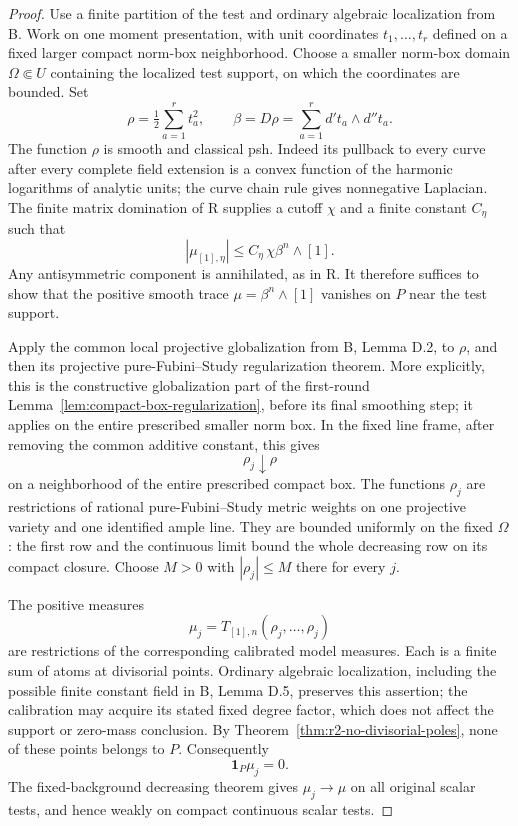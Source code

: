 \documentclass[11pt,a4paper]{article}
\numberwithin{equation}{section}
\theoremstyle{definition}
\theoremstyle{remark}
\begin{document}
\begin{proof}
Use a finite partition of the test and ordinary algebraic
localization from B. Work on one moment presentation, with unit
coordinates $t_1,\ldots,t_r$ defined on a fixed larger compact
norm-box neighborhood. Choose a smaller norm-box domain
$\Omega\Subset U$ containing the localized test support, on
which the coordinates are bounded. Set
\[
 \rho=\tfrac12\sum_{a=1}^r t_a^2,
 \qquad \beta=D\rho=\sum_{a=1}^r d't_a\wedge d''t_a.
\]
The function $\rho$ is smooth and classical psh. Indeed its
pullback to every curve after every complete field extension is
a convex function of the harmonic logarithms of analytic units;
the curve chain rule gives nonnegative Laplacian.
The finite matrix domination of R supplies a cutoff $\chi$ and
a finite constant $C_\eta$ such that
\begin{equation}
\label{eq:r2-ambient-trace-domination}
 |\mu_{[1],\eta}|\leq C_\eta\,\chi\beta^n\wedge[1].
\end{equation}
Any antisymmetric component is annihilated, as in R. It therefore
suffices to show that the positive smooth trace
$\mu=\beta^n\wedge[1]$ vanishes on $P$ near the test support.

Apply the common local projective globalization from B, Lemma
D.2, to $\rho$, and then its projective pure-Fubini--Study
regularization theorem. More explicitly, this is the constructive
globalization part of the first-round
Lemma~\ref{lem:compact-box-regularization}, before its final
smoothing step; it applies on the entire prescribed smaller
norm box. In the fixed line frame, after removing
the common additive constant, this gives
\[
 \rho_j\downarrow\rho
\]
on a neighborhood of the entire prescribed compact box. The
functions $\rho_j$ are restrictions of rational pure-Fubini--Study
metric weights on one projective variety and one identified ample
line. They are bounded uniformly on the fixed $\Omega$: the
first row and the continuous limit bound the whole decreasing
row on its compact closure. Choose $M>0$ with
$|\rho_j|\leq M$ there for every $j$.

The positive measures
\[
 \mu_j=T_{[1],n}(\rho_j,\ldots,\rho_j)
\]
are restrictions of the corresponding calibrated model measures.
Each is a finite sum of atoms at divisorial points. Ordinary
algebraic localization, including the possible finite constant
field in B, Lemma D.5, preserves this assertion; the calibration
may acquire its stated fixed degree factor, which does not affect
the support or zero-mass conclusion. By
Theorem~\ref{thm:r2-no-divisorial-poles}, none of these points
belongs to $P$. Consequently
\[
 \mathbf1_P\mu_j=0.
\]
The fixed-background decreasing theorem gives
$\mu_j\to\mu$ on all original scalar tests, and hence weakly
on compact continuous scalar tests.


\end{proof}
\end{document}
